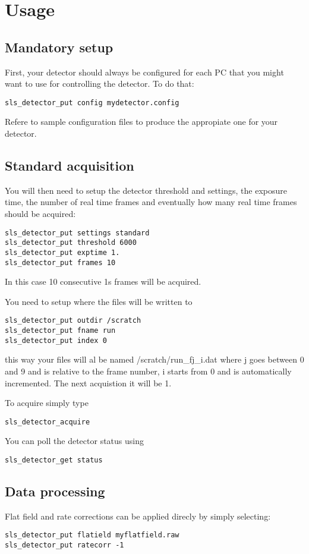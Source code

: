 \documentclass{article}
\begin{document}
\section{Usage}

\subsection{Mandatory setup}
First, your detector should always be configured for each PC that you might want to use for controlling the detector.
To do that:
\begin{verbatim}
sls_detector_put config mydetector.config
\end{verbatim}
Refere to sample configuration files to produce the appropiate one for your detector.

\subsection{Standard acquisition}

You will then need to setup the detector threshold and settings, the exposure time, the number of real time frames and eventually how many real time frames should be acquired:
\begin{verbatim}
sls_detector_put settings standard
sls_detector_put threshold 6000
sls_detector_put exptime 1.
sls_detector_put frames 10
\end{verbatim}
In this case 10 consecutive 1s frames will be acquired.

You need to setup where the files will be written to
\begin{verbatim}
sls_detector_put outdir /scratch
sls_detector_put fname run
sls_detector_put index 0
\end{verbatim}
this way your files will al be named /scratch/run\_fj\_i.dat where j goes between 0 and 9 and is relative to the frame number, i starts from 0 and is automatically incremented. The next acquistion it will be 1.


To acquire simply type
\begin{verbatim}
sls_detector_acquire
\end{verbatim}


You can poll the detector status using
\begin{verbatim}
sls_detector_get status 
\end{verbatim}


\subsection{Data processing}
Flat field and rate corrections can be applied direcly by simply selecting:
\begin{verbatim}
sls_detector_put flatield myflatfield.raw
sls_detector_put ratecorr -1
\end{verbatim}
\end{document}
